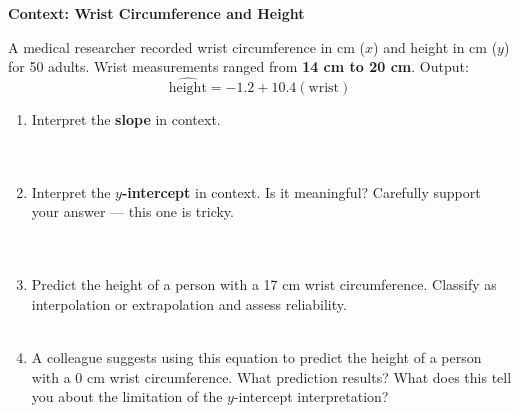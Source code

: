 \documentclass[10pt]{article}
\begin{document}
\begin{tcolorbox}[colback=white, colframe=black!40, boxrule=0.8pt, arc=2mm,
    left=4mm, right=4mm, top=3mm, bottom=3mm,
    title={\textbf{Tier E --- Extension}}, fonttitle=\bfseries, halign title=center]
\small

\textbf{Context: Wrist Circumference and Height}

A medical researcher recorded wrist circumference in cm ($x$) and height in cm ($y$) for
50 adults. Wrist measurements ranged from \textbf{14 cm to 20 cm}. Output:
\[
  \widehat{\text{height}} = -1.2 + 10.4(\text{wrist})
\]

\vspace{8pt}

\begin{enumerate}[leftmargin=1.6em, itemsep=0.18in]

  \item Interpret the \textbf{slope} in context.\\[8pt]
        \writeline\\[3pt]\writeline\\[3pt]\writeline

  \item Interpret the \textbf{$y$-intercept} in context.
        Is it meaningful? Carefully support your answer --- this one is tricky.\\[8pt]
        \writeline\\[3pt]\writeline\\[3pt]\writeline

  \item Predict the height of a person with a 17 cm wrist circumference.
        Classify as interpolation or extrapolation and assess reliability.\\[8pt]
        \writeline\\[3pt]\writeline

  \item A colleague suggests using this equation to predict the height of a person with a
        0 cm wrist circumference. What prediction results? What does this tell you about
        the limitation of the $y$-intercept interpretation?\\[8pt]
        \writeline\\[3pt]\writeline\\[3pt]\writeline

\end{enumerate}
\end{tcolorbox}
\end{document}
